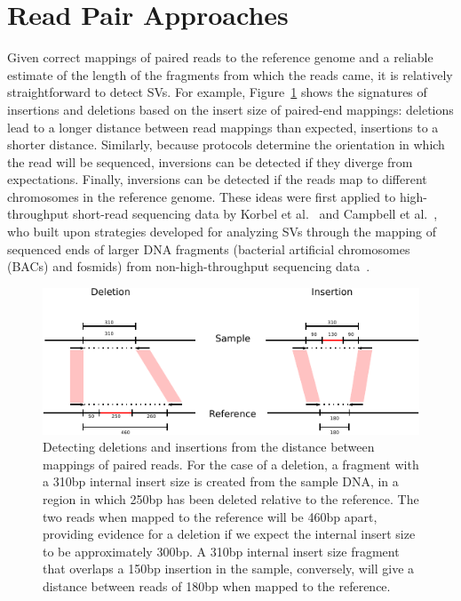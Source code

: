 \section{Read Pair Approaches}\label{section_read_pair}

Given correct mappings of paired reads to the reference genome and a reliable estimate of the length of the fragments from which the reads came, it is relatively straightforward to detect SVs. For example, Figure~\ref{rp_signatures} shows the signatures of insertions and deletions based on the insert size of paired-end mappings: deletions lead to a longer distance between read mappings than expected, insertions to a shorter distance. Similarly, because protocols determine the orientation in which the read will be sequenced, inversions can be detected if they diverge from expectations. Finally, inversions can be detected if the reads map to different chromosomes in the reference genome. These ideas were first applied to high-throughput short-read sequencing data by Korbel et al.~\cite{Korbel:2007p544} and Campbell et al.~\cite{Campbell:2008p539}, who built upon strategies developed for analyzing SVs through the mapping of sequenced ends of larger DNA fragments (bacterial artificial chromosomes (BACs) and fosmids) from non-high-throughput sequencing data~\cite{Volik:2003fh,Raphael:2003ug,Tuzun:2005bp}.

\begin{figure}
\centering
\includegraphics[width=\textwidth]{figures/rp_signatures.pdf}
\caption{Detecting deletions and insertions from the distance between mappings of paired reads. For the case of a deletion, a fragment with a 310bp internal insert size is created from the sample DNA, in a region in which 250bp has been deleted relative to the reference. The two reads when mapped to the reference will be 460bp apart, providing evidence for a deletion if we expect the internal insert size to be approximately 300bp. A 310bp internal insert size fragment that overlaps a 150bp insertion in the sample, conversely, will give a distance between reads of 180bp when mapped to the reference.}
\label{rp_signatures}
\end{figure}

